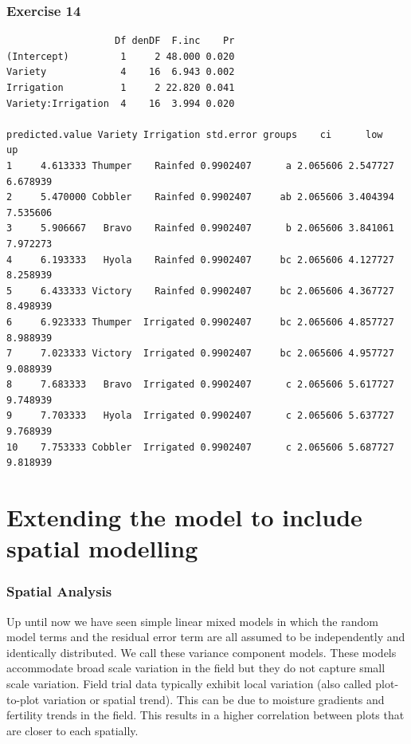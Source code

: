 \begin{frame}[fragile]\frametitle{Exercise 14}
\begin{verbatim}
                   Df denDF  F.inc    Pr
(Intercept)         1     2 48.000 0.020
Variety             4    16  6.943 0.002
Irrigation          1     2 22.820 0.041
Variety:Irrigation  4    16  3.994 0.020

predicted.value Variety Irrigation std.error groups    ci      low       up
1     4.613333 Thumper    Rainfed 0.9902407      a 2.065606 2.547727 6.678939
2     5.470000 Cobbler    Rainfed 0.9902407     ab 2.065606 3.404394 7.535606
3     5.906667   Bravo    Rainfed 0.9902407      b 2.065606 3.841061 7.972273
4     6.193333   Hyola    Rainfed 0.9902407     bc 2.065606 4.127727 8.258939
5     6.433333 Victory    Rainfed 0.9902407     bc 2.065606 4.367727 8.498939
6     6.923333 Thumper  Irrigated 0.9902407     bc 2.065606 4.857727 8.988939
7     7.023333 Victory  Irrigated 0.9902407     bc 2.065606 4.957727 9.088939
8     7.683333   Bravo  Irrigated 0.9902407      c 2.065606 5.617727 9.748939
9     7.703333   Hyola  Irrigated 0.9902407      c 2.065606 5.637727 9.768939
10    7.753333 Cobbler  Irrigated 0.9902407      c 2.065606 5.687727 9.818939

\end{verbatim}
\end{frame}

\section{Extending the model to include spatial modelling}
\begin{frame}\frametitle{Spatial Analysis}
Up until now we have seen simple linear mixed models in which the random model terms and the residual error term are
all assumed to be independently and identically distributed. We call these variance component models. These models
accommodate broad scale variation in the field but they do not capture small scale variation. Field trial data
typically exhibit local variation (also called plot-to-plot variation or spatial trend). This can be due to moisture
gradients and fertility trends in the field. This results in a higher correlation between plots that are closer to each
spatially.
\end{frame}



